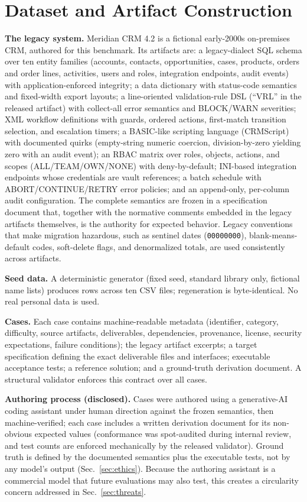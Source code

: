 \documentclass[journal]{IEEEtran}
\begin{document}
\section{Dataset and Artifact Construction}
\label{sec:dataset}
\textbf{The legacy system.} Meridian CRM 4.2 is a fictional early-2000s on-premises CRM,
authored for this benchmark. Its artifacts are: a legacy-dialect SQL schema over ten entity
families (accounts, contacts, opportunities, cases, products, orders and order lines,
activities, users and roles, integration endpoints, audit events) with application-enforced
integrity; a data dictionary with status-code semantics and fixed-width export layouts; a
line-oriented validation-rule DSL (``VRL'' in the released artifact) with collect-all error
semantics and BLOCK/WARN
severities; XML workflow definitions with guards, ordered actions, first-match transition
selection, and escalation timers; a BASIC-like scripting language (CRMScript) with documented
quirks (empty-string numeric coercion, division-by-zero yielding zero with an audit event);
an RBAC matrix over roles, objects, actions, and scopes (ALL/TEAM/OWN/NONE) with
deny-by-default; INI-based integration endpoints whose credentials are vault references; a
batch schedule with ABORT/CONTINUE/RETRY error policies; and an append-only, per-column audit
configuration. The complete semantics are frozen in a specification document that, together
with the normative comments embedded in the legacy artifacts themselves, is the authority for
expected behavior. Legacy conventions that make migration hazardous, such as
sentinel dates (\texttt{00000000}), blank-means-default codes, soft-delete flags, and
denormalized totals, are used consistently across artifacts.

\textbf{Seed data.} A deterministic generator (fixed seed, standard library only, fictional
name lists) produces \SeedRows{} rows across ten CSV files; regeneration is byte-identical. No real personal
data is used.

\textbf{Cases.} Each case contains machine-readable metadata (identifier, category, difficulty,
source artifacts, deliverables, dependencies, provenance, license, security expectations,
failure conditions); the legacy artifact excerpts; a target specification defining the exact
deliverable files and interfaces; executable acceptance tests; a reference solution; and a
ground-truth derivation document. A structural validator enforces this contract over all
\NumCases{} cases.

\textbf{Authoring process (disclosed).} Cases were authored using a generative-AI coding
assistant under human direction against the frozen semantics, then machine-verified; each
case includes a written derivation document for its non-obvious expected values (conformance
was spot-audited during internal review, and test counts are enforced mechanically by the
released validator). Ground truth is defined by the documented semantics plus the executable
tests, not by any model's output (Sec.~\ref{sec:ethics}). Because the authoring assistant is
a commercial model that future evaluations may also test, this creates a circularity concern
addressed in Sec.~\ref{sec:threats}.
\end{document}
